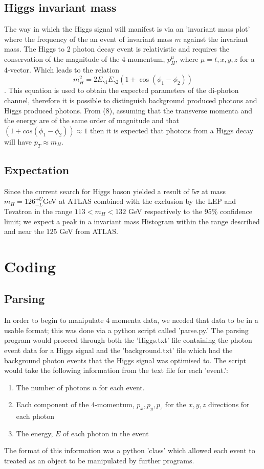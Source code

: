 \documentclass{article}
\begin{document}
\subsection{Higgs invariant mass}
The way in which the Higgs signal will manifest is via an 'invariant mass plot' where the frequency of the an event of invariant mass $m$ against the invariant mass. 
The Higgs to 2 photon decay event is relativistic and requires the conservation of the magnitude of the 4-momentum, $p_H^\mu$, where $\mu = t, x, y, z$ for a 4-vector. Which leads to the relation
\begin{equation}
m_H^2 = 2 E_{\gamma 1} E_{\gamma 2} (1 + \cos(\phi_1 - \phi_2)) 
\end{equation}.
This equation is used to obtain the expected parameters of the di-photon channel, therefore it is possible to distinguish background produced photons and Higgs produced photons. 
From (8), assuming that the transverse momenta and the energy are of the same order of magnitude and that $(1 + cos(\phi_1 - \phi_2)) \approx 1$ then it is expected that photons from a Higgs decay will have $p_T \approx m_H$.

\subsection{Expectation}
Since the current search for Higgs boson yielded a result of $5\sigma$ at mass $m_H = 126^{+ U}_{-L}$GeV at ATLAS combined with the exclusion by the LEP and Tevatron in the range $113 < m_H < 132$ GeV respectively to the 95\% confidence limit; we expect a peak in a invariant mass Histogram within the range described and near the $125$ GeV from ATLAS.
\section{Coding}
\subsection{Parsing}
In order to begin to manipulate 4 momenta data, we needed that data to be in a usable format; this was done via a python script called 'parse.py.' The parsing program would proceed through both the 'Higgs.txt' file containing the photon event data for a Higgs signal and the 'background.txt' file which had the background photon events that the Higgs signal was optimised to. The script would take the following information from the text file for each 'event.':
\begin{enumerate}
\item The number of photons $n$ for each event.
\item Each component of the 4-momentum, $p_x, p_y, p_z$ for the $x, y, z$ directions for each photon
\item The energy, $E$ of each photon in the event
\end{enumerate}
The format of this information was a python 'class' which allowed each event to treated as an object to be manipulated by further programs.
\end{document}
